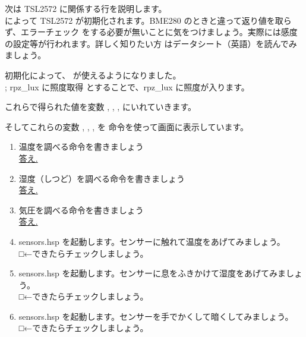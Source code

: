次は TSL2572 に関係する行を説明します。\\
によって TSL2572 が初期化されます。BME280 のときと違って返り値を取らず、エラーチェック
をする必要が無いことに気をつけましょう。実際には感度の設定等が行われます。詳しく知りたい方
はデータシート（英語）を読んでみましょう。

初期化によって、 が使えるようになりました。 \\
 ; rpz\_lux に照度取得
とすることで、rpz\_lux に照度が入ります。

これらで得られた値を変数 , , ,  にいれていきます。\\

そしてこれらの変数 , , ,  を  命令を使って画面に表示しています。\\

\begin{tcolorbox}[title=\useOmetoi]
\begin{enumerate}
\item 温度を調べる命令を書きましょう\\
\underline{答え.\hspace{0.8\linewidth}}
\item 湿度（しつど）を調べる命令を書きましょう\\
\underline{答え.\hspace{0.8\linewidth}}
\item 気圧を調べる命令を書きましょう\\
\underline{答え.\hspace{0.8\linewidth}}
\item sensors.hsp を起動します。センサーに触れて温度をあげてみましょう。\\
□←できたらチェックしましょう。
\item sensors.hsp を起動します。センサーに息をふきかけて湿度をあげてみましょう。\\
□←できたらチェックしましょう。
\item  sensors.hsp を起動します。センサーを手でかくして暗くしてみましょう。\\
□←できたらチェックしましょう。
\end{enumerate}
\end{tcolorbox}
